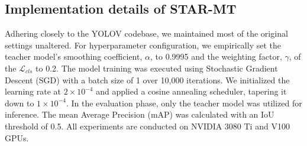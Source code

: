 \subsection{Implementation details of STAR-MT}
Adhering closely to the YOLOV codebase, we maintained most of the original settings unaltered. For hyperparameter configuration, we empirically set the teacher model's smoothing coefficient, $\alpha$, to 0.9995 and the weighting factor, $\gamma$, of the $\mathcal{L}_{cls}$ to 0.2. The model training was executed using Stochastic Gradient Descent (SGD) with a batch size of 1 over 10,000 iterations. We initialized the learning rate at $2 \times 10^{-4}$ and applied a cosine annealing scheduler, tapering it down to $1 \times 10^{-4}$. In the evaluation phase, only the teacher model was utilized for inference. The mean Average Precision (mAP) was calculated with an IoU threshold of 0.5. All experiments are conducted on NVIDIA 3080 Ti and V100 GPUs.


